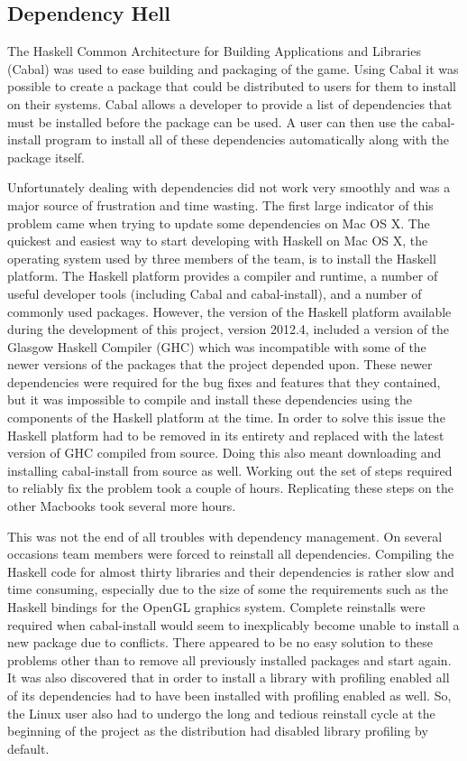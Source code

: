\subsection{Dependency Hell}
\label{ssec:dephell}

The Haskell Common Architecture for Building Applications and Libraries (Cabal) was used to ease
building and packaging of the game. Using Cabal it was possible to create a package that could be
distributed to users for them to install on their systems. Cabal allows a developer to provide a
list of dependencies that must be installed before the package can be used. A user can then use
the cabal-install program to install all of these dependencies automatically along with the package
itself.

Unfortunately dealing with dependencies did not work very smoothly and was a major source of
frustration and time wasting. The first large indicator of this problem came when trying to
update some dependencies on Mac OS X. The quickest and easiest way to start developing with Haskell on
Mac OS X, the operating system used by three members of the team, is to install the Haskell platform.
The Haskell platform provides a compiler and runtime, a number of useful developer tools (including
Cabal and cabal-install), and a number of commonly used packages. However, the version of the
Haskell platform available during the development of this project, version 2012.4, included a
version of the Glasgow Haskell Compiler (GHC) which was incompatible with some of the newer
versions of the packages that the project depended upon. These newer dependencies were required
for the bug fixes and features that they contained, but it was impossible to compile and install
these dependencies using the components of the Haskell platform at the time. In order to solve
this issue the Haskell platform had to be removed in its entirety and replaced with the latest
version of GHC compiled from source. Doing this also meant downloading and installing cabal-install
from source as well. Working out the set of steps required to reliably fix the problem took
a couple of hours. Replicating these steps on the other Macbooks took several more hours.

This was not the end of all troubles with dependency management. On several occasions team
members were forced to reinstall all dependencies. Compiling the Haskell code for almost thirty
libraries and their dependencies is rather slow and time consuming, especially due to the size
of some the requirements such as the Haskell bindings for the OpenGL graphics system.
Complete reinstalls were required when cabal-install would seem to inexplicably become unable
to install a new package due to conflicts. There appeared to be no easy solution to these
problems other than to remove all previously installed packages and start again. It was also
discovered that in order to install a library with profiling enabled all of its dependencies
had to have been installed with profiling enabled as well. So, the Linux user also had to
undergo the long and tedious reinstall cycle at the beginning of the project as the distribution
had disabled library profiling by default.
